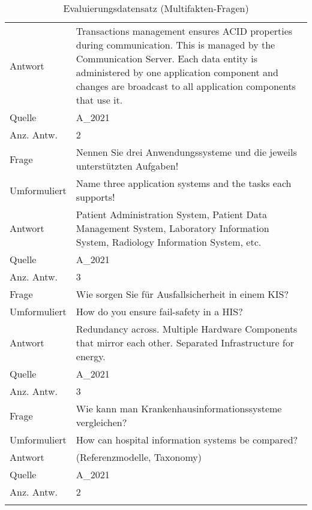 \begin{landscape}
\begin{longtable}{p{3cm}p{}}
    Antwort & Transactions management ensures ACID properties during communication.
    This is managed by the Communication Server.
    Each data entity is administered by one application component and changes are broadcast to all application components that use it.\\
    Quelle & A\_2021 \\
    Anz. Antw. & 2 \\
    \midrule
    Frage & Nennen Sie drei Anwendungssysteme und die jeweils unterstützten Aufgaben! \\
    Umformuliert & Name three application systems and the tasks each supports! \\
    Antwort & Patient Administration System, Patient Data Management System, Laboratory Information System, Radiology Information System, etc. \\
    Quelle & A\_2021 \\
    Anz. Antw. & 3 \\
    \midrule
    Frage & Wie sorgen Sie für Ausfallsicherheit in einem KIS? \\
    Umformuliert & How do you ensure fail-safety in a HIS? \\
    Antwort & Redundancy across.
    Multiple Hardware Components that mirror each other.
    Separated Infrastructure for energy.\\
    Quelle & A\_2021 \\
    Anz. Antw. & 3 \\
    \midrule
    Frage & Wie kann man Krankenhausinformationssysteme vergleichen? \\
    Umformuliert & How can hospital information systems be compared? \\
    Antwort & (Referenzmodelle, Taxonomy) \\
    Quelle & A\_2021 \\
    Anz. Antw. & 2 \\
    \bottomrule
    \caption*{Evaluierungsdatensatz (Multifakten-Fragen)}\label{tab:evaldata-multi}
\end{longtable}
\end{landscape}

